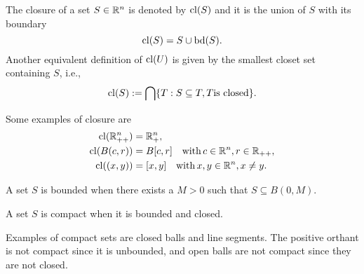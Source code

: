 \documentclass[10pt,a4paper]{article}
\begin{document}
\begin{definition}
	The closure of a set $S\in \mathbb{R}^n$ is denoted by $\mathord{\mathrm{cl}}(S)$ and it is the union of $S$ with its boundary
	\begin{equation*}
		\mathord{\mathrm{cl}}(S)=S \cup \mathord{\mathrm{bd}}(S).
	\end{equation*}
Another equivalent definition of $\mathord{\mathrm{cl}}(U)$ is given by the smallest closet set containing $S$, i.e.,
	\begin{equation*}
		\mathord{\mathrm{cl}}(S):= \bigcap \{T: S \subseteq T, T \text{is closed}\}.
	\end{equation*} 
\end{definition}
\begin{example}
	Some examples of closure are 
	\begin{equation*}
		\begin{split}
			\mathord{\mathrm{cl}}(\mathbb{R}^n_{++}) &= \mathbb{R}^n_+,\\
			\mathord{\mathrm{cl}}(B(c,r)) &= B[c,r] \quad \mathord{\mathrm{with }}\, c \in \mathbb{R}^n, r \in \mathbb{R}_{++},\\
			\mathord{\mathrm{cl}}((x,y)) &= [x,y]\quad \mathord{\mathrm{with }}\, x,y \in \mathbb{R}^n, x\neq y.
		\end{split}
	\end{equation*}
\end{example}
\begin{definition}[Boundedness]
	A set $S$ is bounded when there exists a $M>0$ such that $S\subseteq B(0,M)$.
\end{definition}
\begin{definition}[Compactness]
	A set $S$ is compact when it is bounded and closed.
\end{definition}
\noindent Examples of compact sets are closed balls and line segments. The positive orthant is not compact since it is unbounded, and open balls are not compact since they are not closed.
\end{document}
